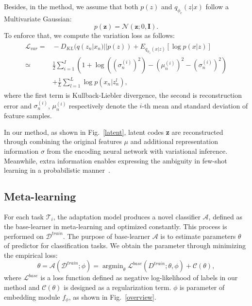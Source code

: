 \documentclass[10pt,conference,a4paper]{IEEEtran}
\begin{document}
Besides, in the method, we assume that both $p (z)$ and $q_{\phi_{e}} (z|x)$ follow a Multivariate Gaussian: 
\begin{equation}
p (\mathbf{z}) = \mathcal N (\mathbf{z}; 0, \mathbf{I}).
\end{equation}
To enforce that, we compute the variation loss as follows: 
\begin{eqnarray}
\label{eqn:variation-loss}
\begin{aligned}
\mathcal L_{var}\! = & \!-\!D_{KL}(q (z_{n}|x_{n})||p (z))\! + \! E_{q_{\phi_{e}}(x|z)}[\log p(x|z)]\\
\simeq & \frac{1}{2}\sum_{i = 1}^{I}(1 + \log ((\sigma^{(i)}_{n})^{2})-(\mu^{(i)}_{n})^{2} - (\sigma^{(i)}_{n})^{2})\\ 
& + \frac{1}{L}\sum_{l = 1}^{L}\log p(x_{n}|z_{n}^{l}), 
\end{aligned}
\end{eqnarray}
where the first term is Kullback-Liebler divergence, the second is reconstruction error and $\sigma^{(i)}_{n}$, $\mu^{(i)}_{n}$ respectively denote the $\mathit{i}$-th mean and standard deviation of feature samples.

In our method, as shown in Fig.~\ref{latent}, latent codes \textbf{z} are reconstructed through combining the original features $\mu$ and additional representation information $\sigma$ from the encoding neural network with variational inference. Meanwhile, extra information enables expressing the ambiguity in few-shot learning in a probabilistic manner~\cite{PLATIPUS2018}.

\subsection{Meta-learning}
For each task $\mathcal{T}_{i}$, the adaptation model produces a novel classifier $\mathcal{A}$, defined as the base-learner in meta-learning and optimized constantly. This process is performed on $\mathcal{D}^{train}$. The purpose of base-learner $\mathcal{A}$ is to estimate parameters $\theta$ of predictor for classification tasks. We obtain the parameter through minimizing the empirical loss: 
\begin{equation}
\label{eqn:empirical-loss}
\theta = \mathcal{A} (\mathcal{D}^{train}; \phi) = \mathop{\arg\min}_{\theta} \mathcal{L}^{base} (D^{train}; \theta, \phi) + \mathcal{C} (\theta), 
\end{equation}
where $\mathcal{L}^{base}$ is a loss function defined as negative log-likelihood of labels in our method and $\mathcal{C} (\theta)$ is designed as a regularization term. $\phi$ is parameter of embedding module $f_{\phi}$, as shown in Fig.~\ref{overview}.
\end{document}
